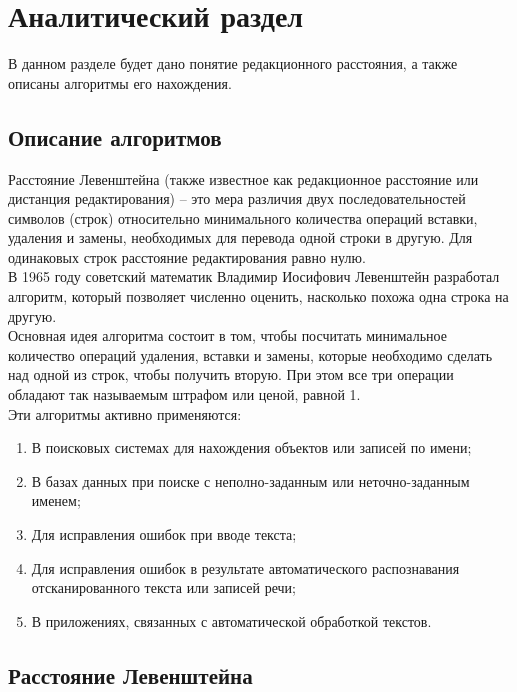 \documentclass[a4paper, 14pt]{article}
\begin{document}
	\newpage
	\section{Аналитический раздел}
	
	В данном разделе будет дано понятие редакционного расстояния, а также описаны алгоритмы его нахождения.
	
	\subsection{Описание алгоритмов}
	
	Расстояние Левенштейна (также известное как редакционное расстояние или дистанция редактирования) – это мера различия двух последовательностей символов (строк) относительно минимального количества операций вставки, удаления и замены, необходимых для перевода одной строки в другую. Для одинаковых строк расстояние редактирования равно нулю.\cite{litlink1} \\
	
	В 1965 году советский математик Владимир Иосифович Левенштейн разработал алгоритм, который позволяет численно оценить, насколько похожа одна строка на другую.\cite{litlink3} \\
	
	Основная идея алгоритма состоит в том, чтобы посчитать минимальное количество операций удаления, вставки и замены, которые необходимо сделать над одной из строк, чтобы получить вторую. При этом все три операции обладают так называемым штрафом или ценой, равной 1.\\
	
	Эти алгоритмы активно применяются\cite{litlink1}:
	\begin{enumerate}
		\item {В поисковых системах для нахождения объектов или записей по имени;}
		\item {В базах данных при поиске с неполно-заданным или неточно-заданным именем;}
		\item {Для исправления ошибок при вводе текста;}
		\item {Для исправления ошибок в результате автоматического распознавания отсканированного текста или записей речи;}
		\item {В приложениях, связанных с автоматической обработкой текстов.}
	\end{enumerate}

	\newpage
	
	\subsection{Расстояние Левенштейна}
	
\end{document}

